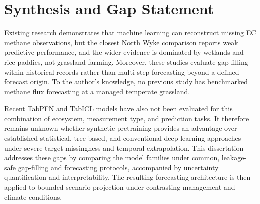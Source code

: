 \section{Synthesis and Gap Statement}

Existing research demonstrates that machine learning can reconstruct missing
EC methane observations, but the closest North Wyke comparison reports weak
predictive performance, and the wider evidence is dominated by wetlands and
rice paddies, not grassland farming. Moreover, these studies evaluate gap-filling 
within historical records rather than multi-step forecasting beyond a defined 
forecast origin. To the author's knowledge, no previous study has benchmarked 
methane flux forecasting at a managed temperate grassland.

Recent TabPFN and TabICL models have also not been evaluated for this
combination of ecosystem, measurement type, and prediction tasks. It therefore
remains unknown whether synthetic pretraining provides an advantage over
established statistical, tree-based, and conventional deep-learning approaches
under severe target missingness and temporal extrapolation. This dissertation
addresses these gaps by comparing the model families under common,
leakage-safe gap-filling and forecasting protocols, accompanied by uncertainty
quantification and interpretability. The resulting forecasting architecture is
then applied to bounded scenario projection under contrasting management and
climate conditions.

